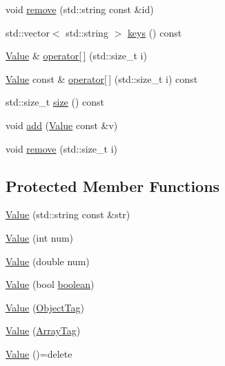 \begin{DoxyCompactItemize}
\item 
void \hyperlink{classj_1_1_value_a590c1697a143f82b3ba7625ee5fedd89}{remove} (std\-::string const \&id)
\item 
std\-::vector$<$ std\-::string $>$ \hyperlink{classj_1_1_value_a048c775e05118ea81ef1465589f90e63}{keys} () const 
\item 
\hyperlink{classj_1_1_value}{Value} \& \hyperlink{classj_1_1_value_a1b61a09b9fccc9b5356a5f30ebce6eb4}{operator\mbox{[}$\,$\mbox{]}} (std\-::size\-\_\-t i)
\item 
\hyperlink{classj_1_1_value}{Value} const \& \hyperlink{classj_1_1_value_aff7ae837a3da198446bf66df3c61f588}{operator\mbox{[}$\,$\mbox{]}} (std\-::size\-\_\-t i) const 
\item 
std\-::size\-\_\-t \hyperlink{classj_1_1_value_a33a99eef89c693d834e391dc8b7aec98}{size} () const 
\item 
void \hyperlink{classj_1_1_value_abcebda8aa6c8e2f58a91c22a8a07e680}{add} (\hyperlink{classj_1_1_value}{Value} const \&v)
\item 
void \hyperlink{classj_1_1_value_ab59e64a499c44665ef338056f46ecaad}{remove} (std\-::size\-\_\-t i)
\end{DoxyCompactItemize}
\subsection*{Protected Member Functions}
\begin{DoxyCompactItemize}
\item 
\hyperlink{classj_1_1_value_a90225534bf6d37de16adb1f1d10bfc64}{Value} (std\-::string const \&str)
\item 
\hyperlink{classj_1_1_value_af9019aad3e70ff3d91517360157040ed}{Value} (int num)
\item 
\hyperlink{classj_1_1_value_a8662002a5abad2e1c2620ddeb20dcfb8}{Value} (double num)
\item 
\hyperlink{classj_1_1_value_ad84533b7a8c5995e6bb277211e679fba}{Value} (bool \hyperlink{classj_1_1_value_ac55f3b10c1cdf64e972218bfe8a4a765}{boolean})
\item 
\hyperlink{classj_1_1_value_af49742c0a6be2a6041168f724aaa0ed5}{Value} (\hyperlink{structj_1_1_value_1_1_object_tag}{Object\-Tag})
\item 
\hyperlink{classj_1_1_value_a23f291de964d8e8e96f53ef42bca5801}{Value} (\hyperlink{structj_1_1_value_1_1_array_tag}{Array\-Tag})
\item 
\hyperlink{classj_1_1_value_a8e4003dd8e5ede9ccc1c6ac0508d3889}{Value} ()=delete
\end{DoxyCompactItemize}
